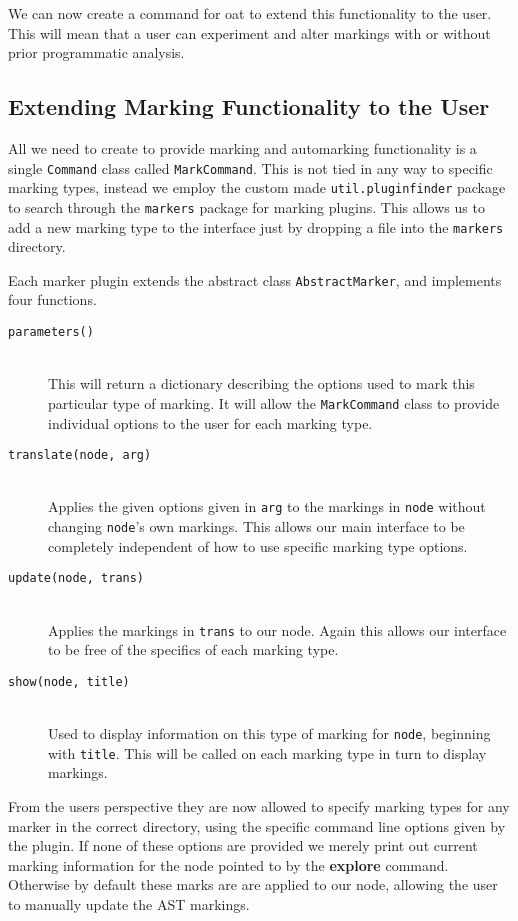 \documentclass{report}
\begin{document}
We can now create a command for oat to extend this functionality to the user. This will mean that a user can experiment and alter markings
with or without prior programmatic analysis.

\subsection{Extending Marking Functionality to the User}

All we need to create to provide marking and automarking functionality is a single \texttt{Command} class called \texttt{MarkCommand}.
This is not tied in any way to specific marking types, instead we employ the custom made \texttt{util.pluginfinder} package to search
through the \texttt{markers} package for marking plugins. This allows us to add a new marking type to the interface just by dropping a
file into the \texttt{markers} directory.

Each marker plugin extends the abstract class \texttt{AbstractMarker}, and implements four functions.

\begin{description}
\item[\texttt{parameters()}] \hfill \\
This will return a dictionary describing the options used to mark this particular type of marking. It will allow the \texttt{MarkCommand}
class to provide individual options to the user for each marking type.
\item[\texttt{translate(node, arg)}] \hfill \\
Applies the given options given in \texttt{arg} to the markings in \texttt{node} without changing \texttt{node}'s own markings. This allows
our main interface to be completely independent of how to use specific marking type options.
\item[\texttt{update(node, trans)}] \hfill \\
Applies the markings in \texttt{trans} to our node. Again this allows our interface to be free of the specifics of each marking type.
\item[\texttt{show(node, title)}] \hfill \\
Used to display information on this type of marking for \texttt{node}, beginning with \texttt{title}. This will be called on each marking
type in turn to display markings.
\end{description}

From the users perspective they are now allowed to specify marking types for any marker in the correct directory, using the specific command
line options given by the plugin. If none of these options are provided we merely print out current marking information for the node pointed to
by the \textbf{explore} command. Otherwise by default these marks are are applied to our node, allowing the user to manually update the AST
markings.
\end{document}
